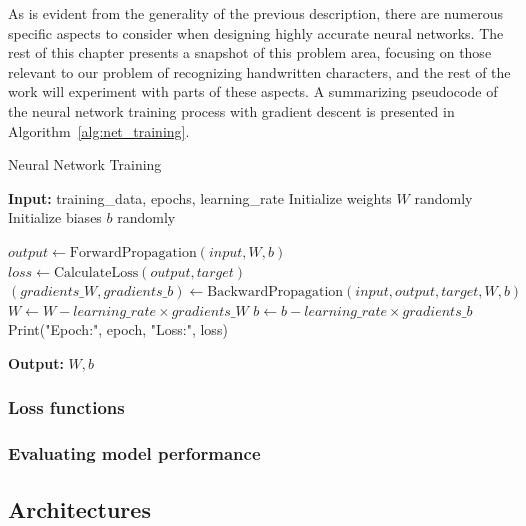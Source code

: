 \documentclass{article}
\begin{document}
As is evident from the generality of the previous description, there are numerous 
specific aspects to consider when designing highly accurate neural networks. The 
rest of this chapter presents a snapshot of this problem area, focusing on those 
relevant to our problem of recognizing handwritten characters, and the rest of the 
work will experiment with parts of these aspects. A summarizing pseudocode of the 
neural network training process with gradient descent is presented in Algorithm~\ref{alg:net_training}.

\begin{algorithm}
    \caption{Neural Network Training}
    \begin{algorithmic}[1]
        \State \textbf{Input:} training\_data, epochs, learning\_rate
        \State Initialize weights $W$ randomly
        \State Initialize biases $b$ randomly
        
                \State $output \gets \text{ForwardPropagation}(input, W, b)$
                \State $loss \gets \text{CalculateLoss}(output, target)$
                \State $(gradients\_W, gradients\_b) \gets \text{BackwardPropagation}(input, output, target, W, b)$
                \State $W \gets W - learning\_rate \times gradients\_W$
                \State $b \gets b - learning\_rate \times gradients\_b$
            \EndFor
            \State Print("Epoch:", epoch, "Loss:", loss)
        \EndFor
        
        \State \textbf{Output:} $W, b$  
    \end{algorithmic}
    \label{alg:net_training}
\end{algorithm}

\subsubsection{Loss functions}
\label{sect:loss_funcs}

\subsubsection{Evaluating model performance}
\label{sect:eval_metrics}

\subsection{Architectures}
\end{document}
